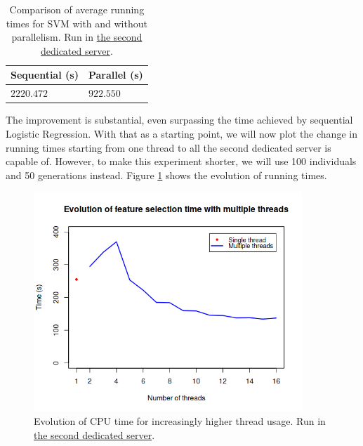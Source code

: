 		\begin{table}[!h]

	        \centering
	        \setlength\arrayrulewidth{0.8pt}

	        \begin{tabular}{| >{\centering\arraybackslash}m{1in} | >{\centering\arraybackslash}m{1in} |}

	            \hline
	            \rowcolor{RoyalBlue}
	            \textbf{Sequential (s)} & \textbf{Parallel (s)} \\
	            \hline
	            $2220.472$ & $922.550$ \\
	            \hline

	        \end{tabular}

	        \caption[Average running times: sequential SVM and parallel SVM]{Comparison of average running times for SVM with and without parallelism. Run in \hyperlink{server:secondserver}{the second dedicated server}.}\label{table:svm_sequential_parallel}

	    \end{table}

\newpage

		The improvement is substantial, even surpassing the time achieved by sequential Logistic Regression. With that as a starting point, we will now plot the change in running times starting from one thread to all the second dedicated server is capable of. However, to make this experiment shorter, we will use 100 individuals and 50 generations instead. Figure \ref{gfx:fs_sequential_parallel} shows the evolution of running times.

		\begin{figure}[bth]

			\myfloatalign
			\includegraphics[width=0.9\textwidth]{gfx/FS_Sequential_Parallel.png}
			\caption[Sequential against parallel feature selection]{Evolution of CPU time for increasingly higher thread usage. Run in \hyperlink{server:secondserver}{the second dedicated server}.}\label{gfx:fs_sequential_parallel}

		\end{figure}

